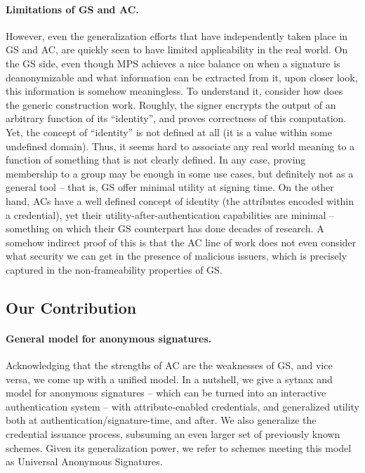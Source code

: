 \paragraph{Limitations of GS and AC.} %
However, even the generalization efforts that have independently taken place in
GS and AC, are quickly seen to have limited applicability in the real world.
On the GS side, even though MPS achieves a nice balance on when a signature is
deanonymizable and what information can be extracted from it, upon closer look,
this information is somehow meaningless. To understand it, consider how does the
generic construction work. Roughly, the signer encrypts the output of an
arbitrary function of its ``identity'', and proves correctness of this
computation. Yet, the concept of ``identity'' is not defined at all (it is a
value within some undefined domain). Thus, it seems hard to associate any real
world meaning to a function of something that is not clearly defined. In any
case, proving membership to a group may be enough in some use cases, but
definitely not as a general tool -- that is, GS  offer minimal utility at
signing time.
%
On the other hand, ACs have a well defined concept of identity (the attributes
encoded within a credential), yet their utility-after-authentication
capabilities are 
minimal -- something on which their GS counterpart has done decades of research.
A somehow indirect proof of this is that the AC line of work does not even
consider what security we can get in the presence of malicious issuers, which
is precisely captured in the non-frameability properties of GS.

\subsection{Our Contribution} 

\paragraph{General model for anonymous signatures.} %
Acknowledging that the strengths of AC are the weaknesses of GS, and vice versa,
we come up with a unified model. In a nutshell, we give a sytnax and model for
anonymous signatures -- which can be turned into an interactive authentication
system -- with attribute-enabled credentials, and generalized utility
both at authentication/signature-time, and after. We also generalize the
credential issuance process, subsuming an even larger set of previously
known schemes. Given its generalization power, we refer to schemes meeting this
model as Universal Anonymous Signatures.

